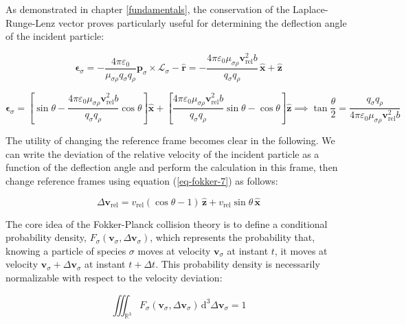 As demonstrated in chapter \ref{fundamentals}, the conservation of the Laplace-Runge-Lenz vector proves particularly useful for determining the deflection angle of the incident particle:

\begin{equation}
   \boldsymbol{\epsilon}_\sigma=-\frac{4\pi\varepsilon_0}{\mu_{\sigma\rho}q_\sigma q_\rho }\mathbf{p}_\sigma\times\boldsymbol{\mathcal{L}}_\sigma-\mathbf{\hat{r}}=-\frac{4\pi\varepsilon_0\mu_{\sigma\rho}\mathbf{v}_\text{rel}^2b}{q_\sigma q_\rho }\,\mathbf{\hat{x}}+\mathbf{\hat{z}}
\end{equation}

\begin{equation}
    \boldsymbol{\epsilon}_\sigma=\left[\sin{\theta}-\frac{4\pi\varepsilon_0\mu_{\sigma\rho}\mathbf{v}_\text{rel}^2 b}{q_\sigma q_\rho }\cos{\theta}\right]\mathbf{\hat{x}}+\left[\frac{4\pi\varepsilon_0\mu_{\sigma\rho}\mathbf{v}_\text{rel}^2b}{q_\sigma q_\rho }\sin{\theta}-\cos{\theta}\right]\mathbf{\hat{z}}\implies\tan{\frac{\theta}{2}}=\frac{q_\sigma q_\rho }{4\pi\varepsilon_0\mu_{\sigma\rho}\mathbf{v}_\text{rel}^2b}
\end{equation}

The utility of changing the reference frame becomes clear in the following. We can write the deviation of the relative velocity of the incident particle as a function of the deflection angle and perform the calculation in this frame, then change reference frames using equation (\ref{eq-fokker-7}) as follows:

\begin{equation}
    \Delta\mathbf{v}_\text{rel}=v_\text{rel}(\cos{\theta}-1)\,\mathbf{\hat{z}}+v_\text{rel}\sin{\theta}\,\mathbf{\hat{x}}
\end{equation}

The core idea of the Fokker-Planck collision theory is to define a conditional probability density, $F_\sigma(\mathbf{v}_\sigma,\Delta\mathbf{v}_\sigma)$, which represents the probability that, knowing a particle of species $\sigma$ moves at velocity $\mathbf{v}_\sigma$ at instant $t$, it moves at velocity $\mathbf{v}_\sigma+\Delta\mathbf{v}_\sigma$ at instant $t+\Delta t$. This probability density is necessarily normalizable with respect to the velocity deviation:

\begin{equation}
    \iiint_{\mathbb{R}^3} F_\sigma(\mathbf{v}_\sigma,\Delta\mathbf{v}_\sigma)\,\mathrm{d}^3\Delta\mathbf{v}_\sigma=1
\end{equation}

